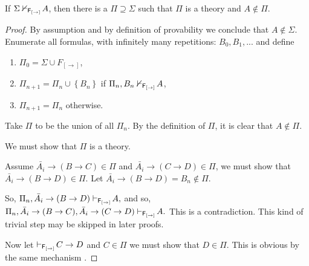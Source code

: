\documentclass[10pt,a4paper]{amsart}
\begin{document}
\begin{lem}
\label{g}
If $ \Sigma\nvdash_{{\sf F_{[\rightarrow]}} }\!A$, then there is a $ \Pi\supseteq \Sigma $  such that $ \Pi $ is a theory and $ A \notin \Pi $.
\end{lem}

\begin{proof} By assumption and by definition of provability we conclude that  $ A \notin \Sigma $. Enumerate all formulas, with infinitely many repetitions: $ B_{0}, B_{1}, ... $ and define
\begin{enumerate}
\item[] $ \Pi_{0}=\Sigma \cup F_{[\rightarrow]}$,

\item[] $ \Pi_{n+1}= \Pi_{n} \cup \left\lbrace B_{n} \right\rbrace  $ if $ \Pi_{n} , B_{n} \nvdash_{{\sf F_{[\rightarrow]}} }\!A $,

\item[]   $ \Pi_{n+1}=  \Pi_{n}  $ otherwise.
 \end{enumerate}
 Take $\Pi $ to be the union of all $ \Pi_{n} $.
By the definition of $ \Pi $, it is clear that $ A \notin \Pi $.

We must show that $\Pi $ is a theory.

\noindent Assume  $\bar{A_{i}}\rightarrow (B\rightarrow C) \in \Pi $ and $\bar{A_{i}}\rightarrow (C\rightarrow D) \in \Pi $, we must show that $\bar{A_{i}}\rightarrow (B\rightarrow D) \in \Pi $.  Let
$\bar{A_{i}}\rightarrow (B\rightarrow D) = B_{n} \notin \Pi $.

So,
$\Pi_{n}, \bar{A_{i}}\rightarrow (B\rightarrow D) \vdash_{{\sf F_{[\rightarrow]}} }\!A,$
and so,
$\Pi_{n}, \bar{A_{i}}\rightarrow (B\rightarrow C), \bar{A_{i}}\rightarrow (C\rightarrow D) \vdash_{{\sf F_{[\rightarrow]}} }\!A.$
This is a contradiction. This kind of trivial step may be skipped in later proofs.

\noindent Now let $\vdash_{{\sf F_{[\rightarrow]}} }\!C\rightarrow D$ and $ C \in \Pi $ we must show that $ D \in \Pi$. This is obvious by the same mechanism .
\end{proof}
\end{document}
